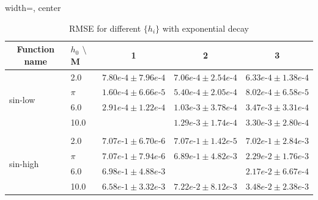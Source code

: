 \begin{table}[ht]
\caption{RMSE for different $\{h_i\}$ with exponential decay}
\label{table: sin-low with exponential decay}
\begin{center}
\begin{adjustbox}{width=\columnwidth, center}
\begin{tabular}{lllll}
\multicolumn{1}{c}{\bf Function name}& $h_0$ $\setminus$ M& \multicolumn{1}{c}{1} &\multicolumn{1}{c}{2} & \multicolumn{1}{c}{3}
\\ \hline 
\multirow{4}{*}{sin-low} &2.0     & $7.80e\mbox{-}4 \pm 7.96e\mbox{-}4$   & $7.06e\mbox{-}4 \pm 2.54e\mbox{-}4$ & $6.33e\mbox{-}4 \pm 1.38e\mbox{-}4$  \\
                         & $\pi$  & $1.60e\mbox{-}4 \pm 6.66e\mbox{-}5$   & $5.40e\mbox{-}4 \pm 2.05e\mbox{-}4$ & $8.02e\mbox{-}4 \pm 6.58e\mbox{-}5$  \\
                         & 6.0    & $2.91e\mbox{-}4 \pm 1.22e\mbox{-}4$   & $1.03e\mbox{-}3 \pm 3.78e\mbox{-}4$ & $3.47e\mbox{-}3 \pm 3.31e\mbox{-}4$  \\
                         & 10.0   & \color{red}{$1.49e\mbox{-}4 \pm 8.74e\mbox{-}5$}   & $1.29e\mbox{-}3 \pm 1.74e\mbox{-}4$ & $3.30e\mbox{-}3 \pm 2.80e\mbox{-}4$  \\
\\
\multirow{4}{*}{sin-high} &2.0     & $7.07e\mbox{-}1 \pm 6.70e\mbox{-}6$    & $7.07e\mbox{-}1 \pm 1.42e\mbox{-}5$ & $7.02e\mbox{-}1 \pm 2.84e\mbox{-}3$ \\
                         & $\pi$  & $7.07e\mbox{-}1 \pm 7.94e\mbox{-}6$    & $6.89e\mbox{-}1 \pm 4.82e\mbox{-}3$ & $2.29e\mbox{-}2 \pm 1.76e\mbox{-}3$ \\
                         & 6.0    & $6.98e\mbox{-}1 \pm 4.88e\mbox{-}3$    & \color{red}{$1.20e\mbox{-}2 \pm 1.35e\mbox{-}3$} & $2.17e\mbox{-}2 \pm 6.67e\mbox{-}4$ \\
                         & 10.0   & $6.58e\mbox{-}1 \pm 3.32e\mbox{-}3$    & $7.22e\mbox{-}2 \pm 8.12e\mbox{-}3$ & $3.48e\mbox{-}2 \pm 2.38e\mbox{-}3$ \\
\end{tabular}
\end{adjustbox}
\end{center}
\end{table}
